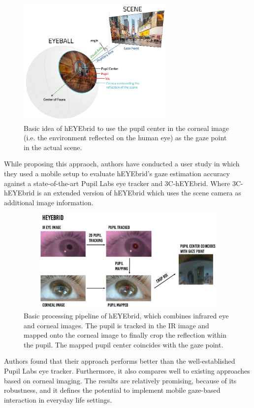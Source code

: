 \begin{figure}[!hbt]
  \centering
  \includegraphics[width=3in,height=2.5in]{lander1.png}
  \caption{Basic idea of hEYEbrid to use the pupil center in the corneal image (i.e. the environment reflected on the human eye) as the gaze point in the actual scene.}
  \label{lander1}
\end{figure}


While proposing this appraoch, authors have conducted a user study in which they used a mobile setup to evaluate hEYEbrid’s gaze estimation accuracy against a state-of-the-art Pupil Labs eye tracker and 3C-hEYEbrid. Where 3C-hEYEbrid is an extended version of hEYEbrid which uses the scene camera as additional image information.


\begin{figure}[!hbt]
  \centering
  \includegraphics[width=4.5in,height=2in]{lander2.png}
  \caption{Basic processing pipeline of hEYEbrid, which combines infrared eye and corneal images. The pupil is tracked in the IR image and mapped onto the corneal image to finally crop the reflection within the pupil. The mapped pupil center coincides with the gaze point.}
  \label{lander2}
\end{figure}



Authors found that their approach performs better than the well-established Pupil Labs eye tracker. Furthermore, it also compares well to existing approaches based on corneal imaging. The results are relatively promising, because of its robustness, and it defines the potential to implement mobile gaze-based interaction in everyday life settings.

